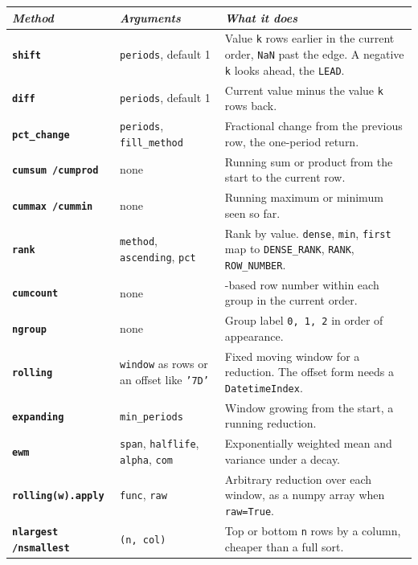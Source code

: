 \begin{table}[H]
\centering
\footnotesize
\renewcommand{\arraystretch}{1.4}
\begin{tabularx}{\textwidth}{>{\raggedright\arraybackslash}p{} >{\raggedright\arraybackslash}p{} >{\raggedright\arraybackslash}X}
\toprule
\textit{Method} & \textit{Arguments} & \textit{What it does} \\
\midrule
\textbf{\texttt{shift}} & \texttt{periods}, default 1 & Value \texttt{k} rows earlier in the current order, \texttt{NaN} past the edge. A negative \texttt{k} looks ahead, the \texttt{LEAD}. \\
\textbf{\texttt{diff}} & \texttt{periods}, default 1 & Current value minus the value \texttt{k} rows back. \\
\textbf{\texttt{pct\_change}} & \texttt{periods}, \texttt{fill\_method} & Fractional change from the previous row, the one-period return. \\
\textbf{\texttt{cumsum /\allowbreak cumprod}} & none & Running sum or product from the start to the current row. \\
\textbf{\texttt{cummax /\allowbreak cummin}} & none & Running maximum or minimum seen so far. \\
\textbf{\texttt{rank}} & \texttt{method}, \texttt{ascending}, \texttt{pct} & Rank by value. \texttt{dense}, \texttt{min}, \texttt{first} map to \texttt{DENSE\_RANK}, \texttt{RANK}, \texttt{ROW\_NUMBER}. \\
\textbf{\texttt{cumcount}} & none & 0-based row number within each group in the current order. \\
\textbf{\texttt{ngroup}} & none & Group label \texttt{0, 1, 2} in order of appearance. \\
\textbf{\texttt{rolling}} & \texttt{window} as rows or an offset like \texttt{'7D'} & Fixed moving window for a reduction. The offset form needs a \texttt{DatetimeIndex}. \\
\textbf{\texttt{expanding}} & \texttt{min\_periods} & Window growing from the start, a running reduction. \\
\textbf{\texttt{ewm}} & \texttt{span}, \texttt{halflife}, \texttt{alpha}, \texttt{com} & Exponentially weighted mean and variance under a decay. \\
\textbf{\texttt{rolling(w).apply}} & \texttt{func}, \texttt{raw} & Arbitrary reduction over each window, as a numpy array when \texttt{raw=True}. \\
\textbf{\texttt{nlargest /\allowbreak nsmallest}} & \texttt{(n, col)} & Top or bottom \texttt{n} rows by a column, cheaper than a full sort. \\

\end{tabularx}
\end{table}
